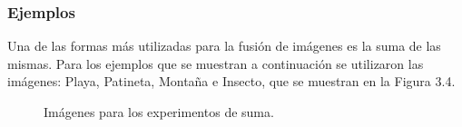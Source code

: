 \subsubsection{Ejemplos}

Una de las formas m\'as utilizadas para la fusi\'on de im\'agenes es la suma de las mismas. Para los ejemplos que se muestran a continuaci\'on se utilizaron las im\'agenes: Playa, Patineta, Monta\~na e Insecto, que se muestran en la Figura 3.4.

\begin{figure}[h]
	\begin{center}
		\caption{Im\'agenes para los experimentos de suma.}
	\end{center}
\end{figure}

